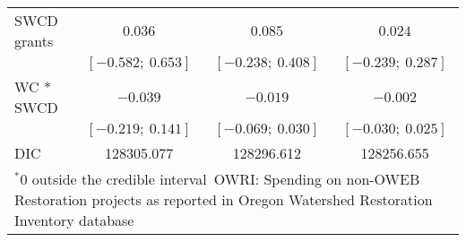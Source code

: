 \begin{table}
\begin{center}
\begin{tabular}{l c c c }
SWCD grants   & $0.036$             & $0.085$             & $0.024$             \\
              & $[-0.582;\ 0.653]$  & $[-0.238;\ 0.408]$  & $[-0.239;\ 0.287]$  \\
WC * SWCD     & $-0.039$            & $-0.019$            & $-0.002$            \\
              & $[-0.219;\ 0.141]$  & $[-0.069;\ 0.030]$  & $[-0.030;\ 0.025]$  \\
\hline
DIC           & 128305.077          & 128296.612          & 128256.655          \\
\hline
\multicolumn{4}{l}{\scriptsize{$^* 0$ outside the credible interval\
       OWRI: Spending on non-OWEB Restoration projects as reported in Oregon Watershed Restoration Inventory database}}
\end{tabular}
\label{table:basemods}
\end{center}
\end{table}

